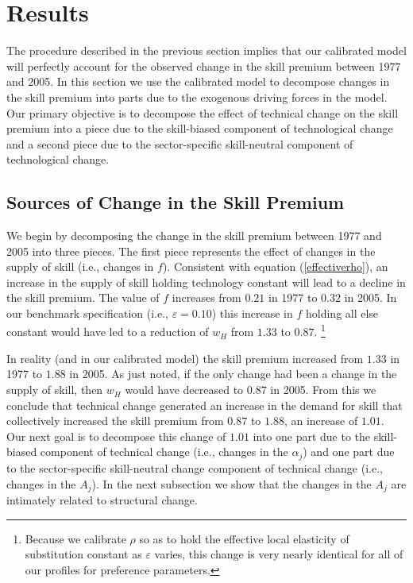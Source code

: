 \documentclass[12pt,english]{article}
\begin{document}
\section{Results}

{\normalsize The procedure described in the previous section implies that
our calibrated model will perfectly account for the observed change in the
skill premium between 1977 and 2005. In this section we use the calibrated
model to decompose changes in the skill premium into parts due to the
exogenous driving forces in the model. Our primary objective is to decompose
the effect of technical change on the skill premium into a piece due to the
skill-biased component of technological change and a second piece due to the
sector-specific skill-neutral component of technological change. }

\subsection{Sources of Change in the Skill Premium}

{\normalsize We begin by decomposing the change in the skill premium between
1977 and 2005 into three pieces. The first piece represents the effect of
changes in the supply of skill (i.e., changes in $f$). Consistent with
equation (\ref{effectiverho}), an increase in the supply of skill holding
technology constant will lead to a decline in the skill premium. The value
of $f$ increases from $0.21$ in 1977 to $0.32$ in 2005. In our benchmark
specification (i.e., $\varepsilon =0.10$) this increase in $f$ holding all
else constant would have led to a reduction of $w_{H}$ from $1.33$ to $0.87$.%
\footnote{%
Because we calibrate $\rho $ so as to hold the effective local elasticity of
substitution constant as $\varepsilon $ varies, this change is very nearly
identical for all of our profiles for preference parameters.} }

{\normalsize In reality (and in our calibrated model) the skill premium
increased from $1.33$ in 1977 to $1.88$ in 2005. As just noted, if the only
change had been a change in the supply of skill, then $w_{H}$ would have
decreased to $0.87$ in 2005. From this we conclude that technical change
generated an increase in the demand for skill that collectively increased
the skill premium from $0.87$ to $1.88$, an increase of $1.01$. Our next
goal is to decompose this change of $1.01$ into one part due to the
skill-biased component of technical change (i.e., changes in the $\alpha
_{j} $) and one part due to the sector-specific skill-neutral change
component of technical change (i.e., changes in the $A_{j}$). In the next
subsection we show that the changes in the $A_{j}$ are intimately related to
structural change. }
\end{document}
